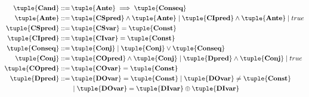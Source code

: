 \begin{align}
\tuple{\textbf{Cand}} ::=\, & \tuple{\textbf{Ante}} \implies \tuple{\textbf{Conseq}} \\
\tuple{\textbf{Ante}} ::=\, & \tuple{\textbf{CSpred}} \land \tuple{\textbf{Ante}} \mid \tuple{\textbf{CIpred}} \land \tuple{\textbf{Ante}} \mid true\\
\tuple{\textbf{CSpred}} ::=\, & \tuple{\textbf{CSvar}} = \tuple{\textbf{Const}} \\
\tuple{\textbf{CIpred}} ::=\, & \tuple{\textbf{CIvar}} = \tuple{\textbf{Const}} \\
\tuple{\textbf{Conseq}} ::=\, & \tuple{\textbf{Conj}} \mid \tuple{\textbf{Conj}} \lor \tuple{\textbf{Conseq}} \\
\tuple{\textbf{Conj}} ::=\, & \tuple{\textbf{COpred}} \land \tuple{\textbf{Conj}} \mid \tuple{\textbf{Dpred}} \land \tuple{\textbf{Conj}} \mid true\\
\tuple{\textbf{COpred}} ::=\, & \tuple{\textbf{COvar}} = \tuple{\textbf{Const}} \\
\tuple{\textbf{Dpred}} ::=\, & \tuple{\textbf{DOvar}} = \tuple{\textbf{Const}} \mid \tuple{\textbf{DOvar}} \neq \tuple{\textbf{Const}} \\
& \mid \tuple{\textbf{DOvar}} = \tuple{\textbf{DIvar}} \oplus \tuple{\textbf{DIvar}} \notag
\end{align}